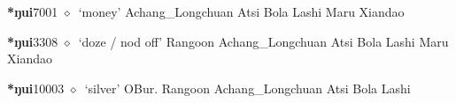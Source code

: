   \begin{list}{}{\leftmargin=1.5em \itemindent=-1.5em}
  \item {\footnotesize \textbf{*ŋui}}{\tiny 7001}
         $\diamond$~`money'
         Achang\_Longchuan 
\hspace{1ex}
         Atsi 
\hspace{1ex}
         Bola 
\hspace{1ex}
         Lashi 
\hspace{1ex}
         Maru 
\hspace{1ex}
         Xiandao 
  \item {\footnotesize \textbf{*ŋui}}{\tiny 3308}
\hspace{1ex}
         $\diamond$~`doze / nod off'
         Rangoon 
\hspace{1ex}
         Achang\_Longchuan 
\hspace{1ex}
         Atsi 
\hspace{1ex}
         Bola 
\hspace{1ex}
         Lashi 
\hspace{1ex}
         Maru 
\hspace{1ex}
         Xiandao 
  \item {\footnotesize \textbf{*ŋui}}{\tiny 10003}
\hspace{1ex}
         $\diamond$~`silver'
         OBur. 
\hspace{1ex}
         Rangoon 
\hspace{1ex}
         Achang\_Longchuan 
\hspace{1ex}
         Atsi 
\hspace{1ex}
         Bola 
\hspace{1ex}
         Lashi 
\hspace{1ex}

\end{list}
